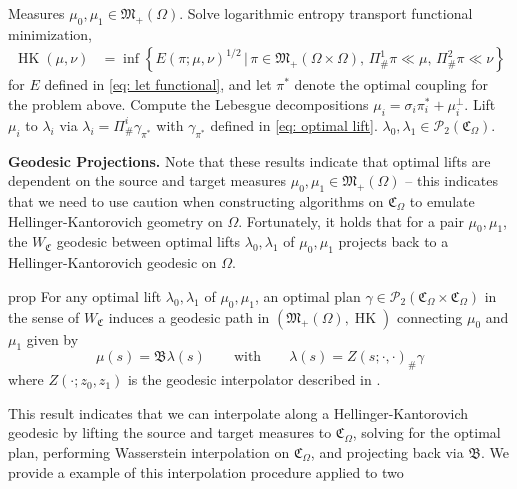 \documentclass[11pt]{article}
\newcommand{\HK}{\operatorname{HK}}
\begin{document}
\begin{algorithm}[H]
    \begin{algorithmic}[1] \label{alg: lift measures to cone}
        \caption{Lift measures from  $(\mathfrak{M}_+(\Omega), \HK)$ to $(\mathcal{P}_{2}(\mathfrak{C}_\Omega), W_2)$}
        \label{alg: let lift}
        \Require Measures $\mu_0, \mu_1 \in \mathfrak{M}_+(\Omega)$.  
        \State Solve logarithmic entropy transport functional minimization,
        \begin{align*} 
            \HK(\mu, \nu) &= \inf\left\{E(\pi;\mu, \nu)^{1/2} \, |\, \pi  \in \mathfrak{M}_+(\Omega \times \Omega), \,\Pi^1_{\#}\pi  \ll \mu, \, \Pi^2_{\#}\pi \ll \nu\right\}
        \end{align*}
        for $E$ defined in \cref{eq: let functional}, and let $\pi^*$ denote the optimal coupling for the problem above. 
        \State Compute the Lebesgue decompositions $\mu_i = \sigma_i\pi_i^* + \mu_i^\perp$.
        \State Lift $\mu_i$ to $\lambda_i$ via $\lambda_i = \Pi^i_{\#}\gamma_{\pi^*}$ with $\gamma_{\pi^*}$ defined in \cref{eq: optimal lift}.
        \State \Return $\lambda_0, \lambda_1  \in \mathcal{P}_{2}(\mathfrak{C}_{\Omega})$. 
    \end{algorithmic}
\end{algorithm}

\noindent \textbf{Geodesic Projections.} Note that these results indicate that optimal lifts are dependent on the source and target measures $\mu_0, \mu_1 \in \mathfrak{M}_+(\Omega)$ -- this indicates that we need to use caution when constructing algorithms on $\mathfrak{C}_\Omega$ to emulate Hellinger-Kantorovich geometry on $\Omega$. Fortunately, it holds that for a pair $\mu_0, \mu_1$, the $W_\mathfrak{C}$ geodesic between optimal lifts $\lambda_0, \lambda_1$ of $\mu_0, \mu_1$ projects back to a Hellinger-Kantorovich geodesic on $\Omega$. 

\begin{restatable}{prop}{} \label{cone geodesics project to hk geodesics}
    For any optimal lift $\lambda_0, \lambda_1$ of $\mu_0, \mu_1$, an optimal plan $\gamma \in \mathcal{P}_2(\mathfrak{C}_\Omega \times \mathfrak{C}_\Omega)$ in the sense of $W_\mathfrak{C}$ induces a geodesic path in $(\mathfrak{M}_+(\Omega), \HK)$ connecting $\mu_0$ and $\mu_1$ given by
    \[\mu(s) = \mathfrak{B}\lambda(s) \qquad \text{with} \qquad \lambda(s) = Z(s; \cdot, \cdot)_\#\gamma\]
    where $Z(\cdot; z_0, z_1)$ is the geodesic interpolator described in .
\end{restatable}
This result indicates that we can interpolate along a Hellinger-Kantorovich geodesic by lifting the source and target measures to $\mathfrak{C}_\Omega$, solving for the optimal plan, performing Wasserstein interpolation on $\mathfrak{C}_\Omega$, and projecting back via $\mathfrak{B}$. We provide a example of this interpolation procedure applied to two 
\end{document}
